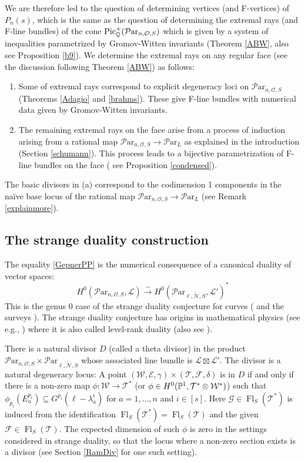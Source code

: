 \documentclass[11pt]{amsart}
\newcommand\mf{\mathcal{F}}
\newcommand\Pic{\operatorname{Pic}}
\newcommand\me{\mathcal{E}}
\newcommand\mt{\mathcal{T}}
\newcommand\Fl{\operatorname{Fl}}
\newcommand\tensor{\otimes}
\newcommand\ml{\mathcal{L}}
\newcommand\mg{\mathcal{G}}
\newcommand\mw{\mathcal{W}}
\newcommand\ParL{\mathcal{P}\text{ar}_L}
\newcommand\Par{\mathcal{P}\text{ar} }
\newcommand{\leto}[1]{\stackrel{#1}{\to}}
\numberwithin{theorem}{subsection}
\begin{document}
{We are therefore led to the question of determining vertices (and F-vertices)  of $P_n(s)$, which is the same as the question of determining the  extremal rays (and F-line bundles) of the cone $\Pic^+_{\Bbb{Q}}(\Par_{n,\mathcal{O},S})$ which is given by a system of inequalities parametrized by Gromov-Witten invariants  (Theorem \ref{ABW}, also see Proposition \ref{b9}). We determine the extremal rays on any regular face (see the discussion following Theorem \ref{ABW}) as follows:
\begin{enumerate}
\item[(a)] Some of extremal rays  correspond to explicit degeneracy loci  on $\Par_{n,\mathcal{O},S}$ (Theorems  \ref{Adagio} and \ref{brahms}). These give F-line bundles with numerical data given by Gromov-Witten invariants.
\item[(b)] The remaining extremal rays  on the face arise from a process of induction arising from a rational map
$\Par_{n,\mathcal{O},S}\to \ParL$ as explained in the introduction (Section \ref{schumann}). This process leads to a bijective parametrization of F-line bundles on the face  ( see Proposition \ref{condensed}).
\end{enumerate}
 The basic divisors in (a) correspond to the codimension 1 components in the na\"ive base locus of the rational map $\Par_{n,\mathcal{O},S}\to \ParL$ (see Remark \ref{explainmore}).
  \subsection{The strange duality construction}\label{understanding}
The equality  \eqref{GepnerPP} is the numerical consequence of a canonical  duality of vector spaces:
\begin{equation}\label{canonD}
H^0(\Par_{n,\mathcal{O},S},\ml)\leto{\sim} H^0(\Par_{\ell,\widetilde{\mathcal{N}},S},\ml')^*
\end{equation}
 This is the genus $0$ case of the strange duality conjecture for curves (\cite{Betrange,MO,Ou} and the surveys  \cite{paulyB, popa}). The strange duality conjecture has origins in mathematical physics (see e.g., \cite{NT}) where it is also called level-rank duality (also see \cite{BJDG}).

There is a natural divisor $D$ (called a theta divisor)  in the product $\Par_{n,\mathcal{O},S}\times \Par_{\ell,\widetilde{\mathcal{N}},S}$ whose associated line bundle is $\ml\boxtimes\ml'$. The divisor is a natural degeneracy locus: A point $(\mw,\me,\gamma)\times (\mt,\mf,\delta)$ is in $D$ if and only if there is a non-zero map $\phi:\mw\to \mt^*$ (or $\phi\in H^0(\Bbb{P}^1,\mt^*\tensor \mw^*)$) such that  $\phi_{p_i}(E^{p_i}_a)\subseteq G^{p_i}(\ell-\lambda^i_a)$ for $a=1,\dots,n$ and $i\in [s]$. Here $\mg\in \Fl_S(\mt^*)$ is induced from the identification  $\Fl_S(\mt^*)= \Fl_S(\mt)$ and the given $\mf\in\Fl_S(\mt)$. The expected dimension of such $\phi$ is zero in the settings considered in strange duality, so that the locus where a non-zero section exists is a divisor (see Section \ref{RamDiv} for one such setting).

}
\end{document}
